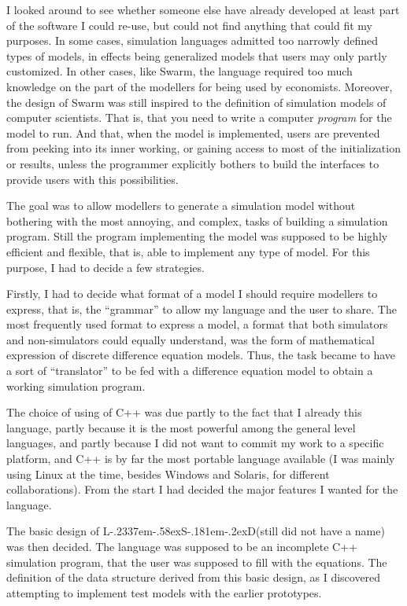 \documentclass [11pt,a4paper] {book}
\def\LsD{{L\kern-.2337em\lower-.58ex\hbox{S}\kern-.181em\lower-.2ex\hbox{D}}\xspace}
\begin{document}
I looked around to see whether someone else have already developed at least part of the software I could re-use, but could not find anything that could fit my purposes. In some cases, simulation languages admitted too narrowly defined types of models, in effects being generalized models that users may only partly customized. In other cases, like Swarm, the language required too much knowledge on the part of the modellers for being used by economists. Moreover, the design of Swarm was still inspired to the definition of simulation models of computer scientists. That is, that you need to write a computer \textit{program} for the model to run. And that, when the model is implemented, users are prevented from peeking into its inner working, or gaining access to most of the initialization or results, unless the programmer explicitly bothers to build the interfaces to provide users with this possibilities.


The goal was to allow modellers to generate a simulation model without bothering with the most annoying, and complex, tasks of building a simulation program. Still the program implementing the model was supposed to be highly efficient and flexible, that is, able to implement any type of model. For this purpose, I had to decide a few strategies.

Firstly, I had to decide what format of a model I should require modellers to express, that is, the ``grammar'' to allow my language and the user to share. The most frequently used format to express a model, a format that both simulators and non-simulators could equally understand, was the form of mathematical expression of discrete difference equation models. Thus, the task became to have a sort of ``translator'' to be fed with a difference equation model to obtain a working simulation program.

The choice of using of C++ was due partly to the fact that I already this language, partly because it is the most powerful among the general level languages, and partly because I did not want to commit my work to a specific platform, and C++ is by far the most portable language available (I was mainly using Linux at the time, besides Windows and Solaris, for different collaborations). From the start I had decided the major features I wanted for the language.

The basic design of \LsD (still did not have a name) was then decided. The language was supposed to be an incomplete C++ simulation program, that the user was supposed to fill with the equations. The definition of the data structure derived from this basic design, as I discovered attempting to implement test models with the earlier prototypes.
\end{document}
